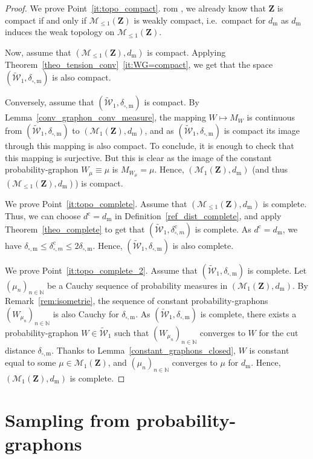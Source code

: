 \documentclass{amsart}
\newcommand{\ie}{i.e.\ }
\theoremstyle{plain}
\theoremstyle{definition}
\newcommand{\Space}{\mathbf{Z}}
\newcommand{\Proba}{\mathcal{M}_1(\Space)}
\newcommand{\SubProba}{\mathcal{M}_{\leq1}(\Space)}
\newcommand{\UGraphon}{\widetilde{\mathcal{W}}_1}
\newcommand{\m}{\mathrm{m}}
\newcommand{\dmeas}{d_\m}
\newcommand{\ddcut}{\delta_{\square,\m}}
\newcommand{\ccc}{\mathrm{c}}
\newcommand{\dmeasC}{d^\ccc}
\newcommand{\ddcutC}{\delta^\ccc_{\square, m}}
\newcommand{\N}{\mathbb{N}}
\begin{document}
\begin{proof}
  We prove Point~\ref{it:topo_compact}. 
rom , we already know that
$\Space$ is compact if and only if $\SubProba$ is weakly compact,
\ie compact for $\dmeas$ as $\dmeas$ 
induces the weak topology on $\SubProba$.

Now, assume that $(\SubProba, \dmeas)$ is compact.
Applying Theorem~\ref{theo_tension_conv}~\ref{it:WG=compact},
we get that the space $(\UGraphon, \ddcut)$ is also compact.

Conversely, assume that $(\UGraphon, \ddcut)$ is compact.
By Lemma~\ref{conv_graphon_conv_measure},
the mapping $W \mapsto M_W$ is continuous
from $(\UGraphon, \ddcut)$ to $(\Proba, \dmeas)$,
and as $(\UGraphon, \ddcut)$ is compact its image through
this mapping is also compact. To conclude, it is enough to check that
this mapping is  surjective. But this is clear as the image of  the
constant probability-graphon $W_\mu \equiv \mu$ is  $M_{W_\mu} = \mu$.
Hence, $(\Proba, \dmeas)$ (and thus $(\SubProba, \dmeas)$) is compact.
\medskip

We prove Point~\ref{it:topo_complete}. 
Assume that $(\SubProba, \dmeas)$ is complete.
Thus, we can choose $\dmeasC = \dmeas$ in Definition~\ref{ref_dist_complete},
and apply Theorem~\ref{theo_complete} to get that $(\UGraphon, \ddcutC)$ is complete.
As $\dmeasC = \dmeas$, we have $\ddcut \leq \ddcutC \leq 2 \ddcut$.
Hence, $(\UGraphon, \ddcut)$ is also complete.
\medskip

We prove  Point~\ref{it:topo_complete_2}.
Assume  that   $(\UGraphon,  \ddcut)$   is  complete.    Let
$(\mu_n )_{n\in\N}$  be a  Cauchy sequence  of probability  measures in
$(\Proba, \dmeas)$.   By Remark~\ref{rem:isometrie}, the  sequence of
constant probability-graphons $(W_{\mu_n} )_{n\in\N}$ 
is also Cauchy  for  $\ddcut$.    As  $(\UGraphon,  \ddcut)$  is  complete,   there  exists  a
probability-graphon $W\in\UGraphon$ such  that $(W_{\mu_n} )_{n\in\N}$ converges to $W$
for      the      cut       distance      $\ddcut$.       Thanks      to
Lemma~\ref{constant_graphons_closed},  $W$  is  constant equal  to  some
$\mu\in\Proba$, and $(\mu_n)_{n\in\N}$ converges  to $\mu$ for $\dmeas$.  Hence,
$(\Proba, \dmeas)$ is complete. 
\end{proof}
 




\section{Sampling from probability-graphons}\label{section_sampling}
\end{document}
